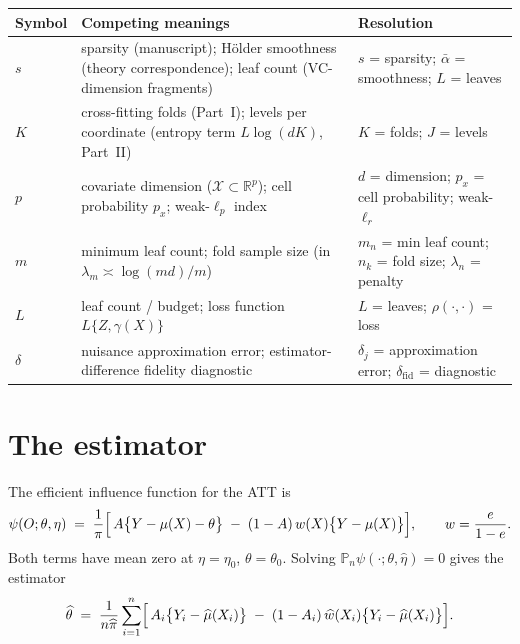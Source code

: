 \documentclass[11pt]{article}
\theoremstyle{plain}
\theoremstyle{definition}
\theoremstyle{remark}
\newcommand{\Pn}{\mathbb{P}_n}
\newcommand{\R}{\mathbb{R}}
\newcommand{\cX}{\mathcal{X}}
\newcommand{\mhat}{\widehat{\mu}}
\newcommand{\what}{\widehat{w}}
\newcommand{\thetahat}{\widehat{\theta}}
\newcommand{\pihat}{\widehat{\pi}}
\begin{document}
\begin{center}
\begin{tabular}{@{}lp{6.2cm}l@{}}
\toprule
Symbol & Competing meanings & Resolution \\
\midrule
$s$ & sparsity (manuscript); H\"older smoothness (theory
      correspondence); leaf count (VC-dimension fragments) &
      $s$ = sparsity; $\bar\alpha$ = smoothness; $L$ = leaves \\
$K$ & cross-fitting folds (Part~I); levels per coordinate
      (entropy term $L\log(dK)$, Part~II) &
      $K$ = folds; $J$ = levels \\
$p$ & covariate dimension ($\cX\subset\R^p$); cell probability
      $p_x$; weak-$\ell_p$ index &
      $d$ = dimension; $p_x$ = cell probability; weak-$\ell_r$ \\
$m$ & minimum leaf count; fold sample size (in $\lambda_m\asymp\log(md)/m$) &
      $m_n$ = min leaf count; $n_k$ = fold size; $\lambda_n$ = penalty \\
$L$ & leaf count / budget; loss function $L\{Z,\gamma(X)\}$ &
      $L$ = leaves; $\rho(\cdot,\cdot)$ = loss \\
$\delta$ & nuisance approximation error; estimator-difference
      fidelity diagnostic &
      $\delta_j$ = approximation error; $\delta_{\mathrm{fid}}$ = diagnostic \\
\bottomrule
\end{tabular}
\end{center}

\section{The estimator}

The efficient influence function for the ATT \citep{hahn1998} is
\begin{equation}\label{eq:score}
  \psi(O;\theta,\eta)
  \;=\; \frac1\pi\Bigl[\,
    A\bigl\{Y-\mu(X)-\theta\bigr\}
    \;-\; (1-A)\,w(X)\bigl\{Y-\mu(X)\bigr\}
  \Bigr],
  \qquad w=\frac{e}{1-e}.
\end{equation}
Both terms have mean zero at $\eta=\eta_0$, $\theta=\theta_0$. Solving
$\Pn\psi(\cdot;\theta,\widehat\eta)=0$ gives the estimator
\begin{equation}\label{eq:att-estimator}
  \thetahat \;=\; \frac{1}{n\pihat}\sum_{i=1}^n
   \Bigl[\, A_i\bigl\{Y_i-\mhat(X_i)\bigr\}
   \;-\; (1-A_i)\,\what(X_i)\bigl\{Y_i-\mhat(X_i)\bigr\}\Bigr].
\end{equation}
\end{document}
